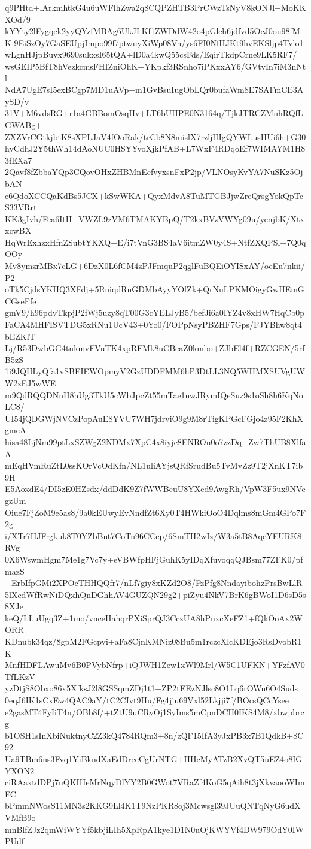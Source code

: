 q9PHtd+lArkmhtkG4u6uWFlhZwa2q8CQPZHTB3PrCWzTsNyV8kONJl+MoKKXOd/9
kYYty2lFygqek2yyQYzfMBAg6UkJLKf1ZWDdW42o4pGlch6jdfvd5OcJ0ou98fMK
9EiSzOy7GaSEUpjImpo99f7ptwuyXiWp08Vn/ys6FI0NfHJKt9hvEKSljp4Tvlo1
wLgnHJjpBuvx9690sukxsI65tQA+lD0a4kwQ55csFds/EqirTkdpCrne9LK5RF7/
wsGEIP5BfT8hVezkcmsFHIZniOhK+YKpkf3RSnho7iPKxxAY6/GVtvIn7iM3nNtl
NdA7UgE7sI5exBCgp7MD1uAVp+m1GvBsuIugObLQr0bufaWm8E7SAFmCE3AySD/v
31V+M6vdsRG+r1a4GBBomOsqHv+LT6bUHPE0N3164q/TjkJTRCZMnhRQfLGWABg+
ZXZVrCGtkjbtK8sXPLJaV4fOoRak/trCb8N8mislX7rzljIHgQYWLusHUi6h+G30
hyCdhJ2Y5thWh14dAoNUC0HSYYvoXjkPfAB+L7WxF4RDqoEf7WIMAYM1H83fEXa7
2Qavf8fZbbaYQp3CQovOHxZHBMnEefvyxsnFxP2jp/VLNOsyKvYA7NuSKz5OjbAN
c6QdoXCCQaKdBs5JCX+kSwWKA+QyxMdvA8TuMTGBJjwZreQrsgYokQpTcS33VRrt
KK3gIvh/Fca6ItH+VWZL9zVM6TMAKYBpQ/T2kxBVzVWYg09u/yenjbK/XtxxcwBX
HqWrExhzxHfnZSubtYKXQ+E/i7tVnG3BS4aV6itmZW0y4S+NtfZXQPSl+7Q0qOOy
Mv8ymzrMBx7cLG+6DzX0L6fCM4zPJFmquP2qglFuBQEiOYISxAY/oeEu7nkii/P2
oTk5CjdsYKHQ3XFdj+5RuiqdRnGDMbAyyYOfZk+QrNuLPKMOigyGwHEmGCGseFfe
gmV9/h96pdvTkpjP2fWj5uzy8qT00G3cYELJyB5/befJi6a0IYZ4v8xHW7HqCb0p
FaCA4MHFISVTDG5xRNu1UcV43+0Yo0/FOPpNsyPBZHF7Gps/FJYBhw8qt4bEZKlT
Lj/R53DwbGG4tnkmvFVuTK4xpRFMk8uCBcaZ0kmbo+ZJbEl4f+RZCGEN/5rfB5zS
1i9JQHLyQfa1vSBEIEWOpmyV2GzUDDFMM6hP3DtLL3NQ5WHMXSUVgUWW2zEJ5wWE
m9QdRQQDNnH8hUg3TkU5cWbJpcZt55mTae1uwJRymIQeSuz9s1oSh8h6KqNoLC8/
UI54jQDGWjNVCzPopAuE8YVU7WH7jdrviO9g9M8rTigKPGcFGjo4z95F2KhXgmeA
hisa48LjNm99ptLxSZWgZ2NDMx7XpC4x8iyjc8ENROn0o7zzDq+Zw7ThUB8XlfaA
mEqHVmRuZtL0ssKOrVcOdKfn/NL1uliAYjsQRfSrudBu5TvMvZz9T2jXnKT7ib9H
E5AoxdE4/DI5zE0HZsdx/ddDdK9Z7fWWBeuU8YXed9AwgRh/VpW3F5ux9NVegzUm
Oiue7FjZoM9e5as8/9a0kEUwyEvNndfZt6Xy0T4HWkiOoO4Dqlms8mGm4GPo7F2g
i/XTr7HJFrgkuk8T0YZbBnt7CoTn96CCep/6SmTH2wIz/W3a5tB8AqeYEURK8RVg
0X6WswmHgm7Me1g7Vc7y+eVBWfpHFjGuhK5yIDqXfuvoqqQJBsm77ZFK0/pfmazS
+ErbIfpGMi2XPOcTHHQQfr7/nLf7giy8xKZd2O8/FzPfg8NndayibohzPrsBwLlR
5lXcdWfRwNiDQxhQnDGhhAV4GUZQN29g2+piZyu4NkV7BrK6gBWoI1D6sD5s8XJe
keQ/LLuUgq3Z+1mo/vnceHahqrPXiSprQJ3CczUA8hPuxcXeFZ1+fQkOoAx2WORR
KDnubk34qz/8gpM2FGcpvi+aFa8CjnKMNiz08Bu5m1rczcXlcKDEjo3RsDvobR1K
MnfHDFLAwuMv6B0PVybNfrp+iQJWH1Zew1xWl9Mrl/W5C1UFKN+YFzfAV0TfLKzV
yzDtjS8Obxo86x5XfksJ2l8GSSqmZDj1t1+ZP2tEEzNJlsc8O1Lq6rOWn6O4Suds
0eqJ6IK1sCxEw4QAC9aY/tC2CIvt9Hu/Fg4jju69Vxl52Lkjji7f/BOcsQCcYsee
e2gasMT4FyIiT4n/OBb8f/+tZtU9uCRyOj1SyIms5mCpnDCH0IKS4M8/xbwpbrcg
b1OSH1sInXbiNuktnyC2Z3kQ4784RQm3+8n/zQF15IfA3yJxPB3x7B1QdkB+8C92
Ua9TBm6ns3Fvq1YiBkndXaEdDreeCgUrNTG+HHcMyATzB2XvQT5uEZ4o8IGYXON2
ciRAaxtdDPj7uQKIHeMrNqyDlYY2B0GWot7VRaZf4KoG5qAih8t3jXkvaooWImFC
bPmmNWosS11MN3s2KKG9Ll4K1T9NzPKR8oj3Mcwsgl39JUuQNTqNyG6udXVMfB9o
mnBlfZJz2qmWiWYYf5kbjiLIh5XpRpA1kye1D1N0uOjKWYVf4DW979OdY0IWPUdf
